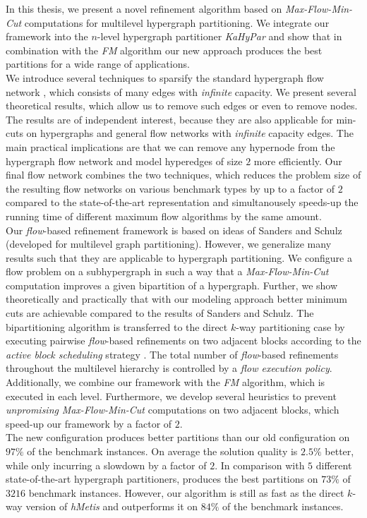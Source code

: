 In this thesis, we present a novel refinement algorithm based on \emph{Max-Flow-Min-Cut}
computations for multilevel hypergraph partitioning. We integrate our framework
into the $n$-level hypergraph partitioner \emph{KaHyPar} and show that
in combination with the \emph{FM} algorithm our new approach produces the best partitions
for a wide range of applications.\\
We introduce several techniques to 
sparsify the standard hypergraph flow network \cite{lawler1973},
which consists of many edges with \emph{infinite} capacity. We present
several theoretical results, which allow us to remove such edges or even to remove
nodes. The results are of independent interest, because they are also
applicable for min-cuts on hypergraphs and general flow networks with \emph{infinite} capacity edges.
The main practical implications are that we can remove any hypernode 
from the hypergraph flow network and model hyperedges of size $2$ more efficiently. 
Our final flow network combines the two techniques, which reduces 
the problem size of the resulting flow networks on various benchmark types by up to 
a factor of $2$ compared to the state-of-the-art representation and
simultanousely speeds-up the running time of different maximum flow algorithms 
by the same amount.  \\
Our \emph{flow}-based refinement framework is based on ideas of Sanders and Schulz
\cite{sanders2011engineering} (developed for multilevel graph partitioning). However,
we generalize many results such that they are applicable to hypergraph partitioning.
We configure a flow problem on a subhypergraph in such a way that a \emph{Max-Flow-Min-Cut}
computation improves a given bipartition of a hypergraph. Further, we show theoretically
and practically that with our modeling approach better minimum cuts are achievable
compared to the results of Sanders and Schulz. The bipartitioning algorithm is transferred
to the direct $k$-way partitioning case by executing pairwise \emph{flow}-based refinements
on two adjacent blocks according to the \emph{active block scheduling} strategy \cite{holtgrewe2010engineering}.
The total number of \emph{flow}-based refinements throughout the multilevel hierarchy
is controlled by a \emph{flow execution policy}. Additionally, we combine our framework
with the \emph{FM} algorithm, which is executed in each level. Furthermore,
we develop several heuristics to prevent \emph{unpromising} \emph{Max-Flow-Min-Cut}
computations on two adjacent blocks, which speed-up our framework
by a factor of $2$. \\
The new configuration  produces better partitions than our old 
configuration  on $97\%$ of the benchmark instances. On average the solution 
quality is $2.5\%$ better, while only incurring a slowdown by a factor of $2$. 
In comparison with $5$ different state-of-the-art hypergraph partitioners,  
produces the best partitions  on $73\%$ of $3216$ benchmark instances. 
However, our algorithm is still as fast as the direct $k$-way
version of \emph{hMetis} and outperforms it on $84\%$ of the benchmark instances.


